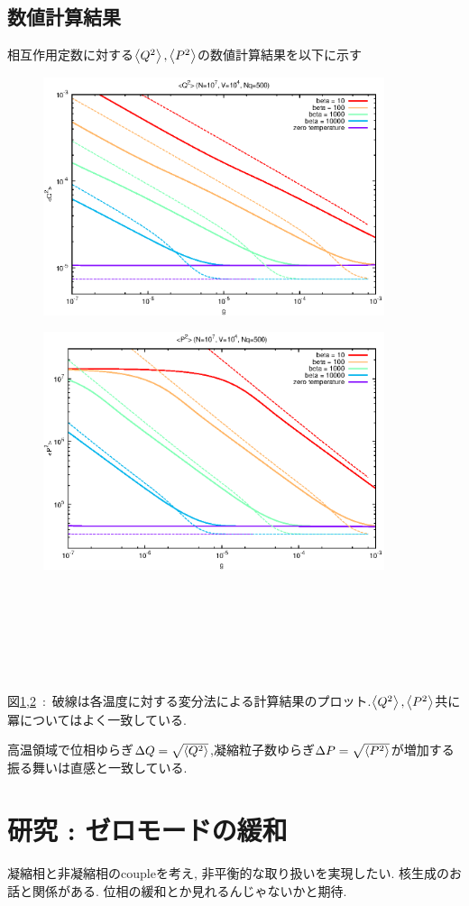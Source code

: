 \documentclass[10.5pt,a4paper]{jreport}
\begin{document}
\section{数値計算結果}
相互作用定数に対する$\ev{Q^2},\ev{P^2}$の数値計算結果を以下に示す
\begin{figure}[htbp]
  \centering
  \includegraphics[width = 10cm]{./Q2.eps}
  \label{Q2}
\end{figure}
\begin{figure}[htbp]
  \centering
  \includegraphics[width = 10cm]{./P2.eps}
  \label{P2}
\end{figure}
\\\\\\\\\\\\
図\ref{Q2},\ref{P2}\ :\ 破線は各温度に対する変分法による計算結果のプロット.$\ev{Q^2},\ev{P^2}$共に冪についてはよく一致している.

高温領域で位相ゆらぎ$\Delta Q = \sqrt{\ev{Q^2}}$,凝縮粒子数ゆらぎ$\Delta P = \sqrt{\ev{P^2}}$が増加する振る舞いは直感と一致している.
\newpage
\chapter{研究 : ゼロモードの緩和}
凝縮相と非凝縮相のcoupleを考え, 非平衡的な取り扱いを実現したい. 核生成のお話と関係がある. 位相の緩和とか見れるんじゃないかと期待. 
\end{document}
